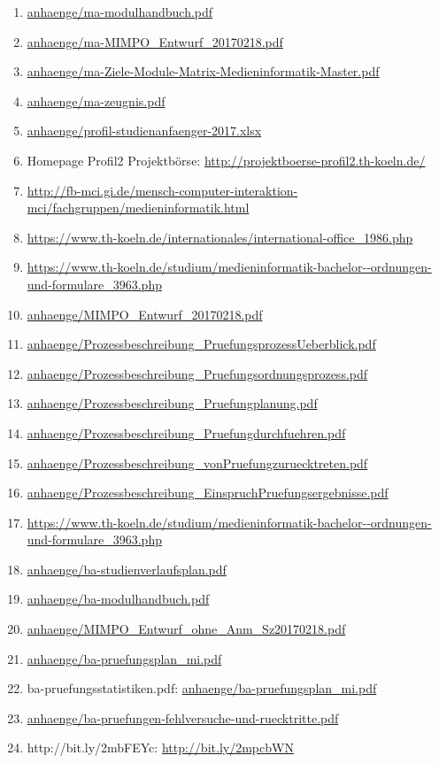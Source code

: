 \documentclass[BCOR12mm,DIV11,titlepage,a4paper,oneside,10pt]{scrbook}
\begin{document}
\begin{sloppypar}
\begin{flushleft}
\begin{enumerate}
\item{\url{anhaenge/ma-modulhandbuch.pdf}} 
\item{\url{anhaenge/ma-MIMPO\_Entwurf\_20170218.pdf}} 
\item{\url{anhaenge/ma-Ziele-Module-Matrix-Medieninformatik-Master.pdf}} 
\item{\url{anhaenge/ma-zeugnis.pdf}} 
\item{\url{anhaenge/profil-studienanfaenger-2017.xlsx}} 
\item{Homepage Profil2 Projektbörse: \url{http://projektboerse-profil2.th-koeln.de/} } 
\item{\url{http://fb-mci.gi.de/mensch-computer-interaktion-mci/fachgruppen/medieninformatik.html}} 
\item{\url{https://www.th-koeln.de/internationales/international-office\_1986.php}} 
\item{\url{https://www.th-koeln.de/studium/medieninformatik-bachelor--ordnungen-und-formulare\_3963.php}} 
\item{\url{anhaenge/MIMPO\_Entwurf\_20170218.pdf}} 
\item{\url{anhaenge/Prozessbeschreibung\_PruefungsprozessUeberblick.pdf}} 
\item{\url{anhaenge/Prozessbeschreibung\_Pruefungsordnungsprozess.pdf}} 
\item{\url{anhaenge/Prozessbeschreibung\_Pruefungplanung.pdf}} 
\item{\url{anhaenge/Prozessbeschreibung\_Pruefungdurchfuehren.pdf}} 
\item{\url{anhaenge/Prozessbeschreibung\_vonPruefungzuruecktreten.pdf}} 
\item{\url{anhaenge/Prozessbeschreibung\_EinspruchPruefungsergebnisse.pdf}} 
\item{\url{https://www.th-koeln.de/studium/medieninformatik-bachelor--ordnungen-und-formulare\_3963.php}} 
\item{\url{anhaenge/ba-studienverlaufsplan.pdf}} 
\item{\url{anhaenge/ba-modulhandbuch.pdf}} 
\item{\url{anhaenge/MIMPO\_Entwurf\_ohne\_Anm\_Sz20170218.pdf}} 
\item{\url{anhaenge/ba-pruefungsplan\_mi.pdf}} 
\item{ba-pruefungsstatistiken.pdf: \url{anhaenge/ba-pruefungsplan\_mi.pdf} } 
\item{\url{anhaenge/ba-pruefungen-fehlversuche-und-ruecktritte.pdf}} 
\item{http://bit.ly/2mbFEYc: \url{http://bit.ly/2mpcbWN} } 

\end{enumerate}
\end{flushleft}
\end{sloppypar}
\end{document}
